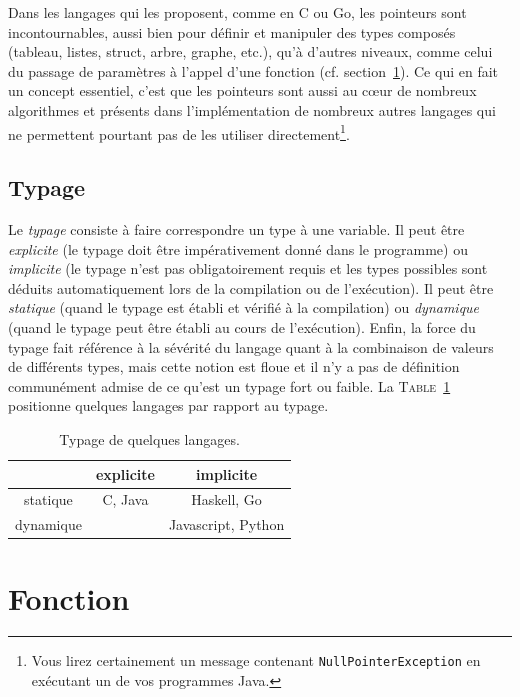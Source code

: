 \documentclass[a4paper,francais]{insalyon}
\begin{document}
Dans les langages qui les proposent, comme en C ou Go, les pointeurs sont incontournables, aussi bien pour définir et manipuler des types composés (tableau, listes, struct, arbre, graphe, etc.), qu'à d'autres niveaux, comme celui du passage de paramètres à l'appel d'une fonction (cf. section~\ref{sec:fonction}). Ce qui en fait un concept essentiel, c'est que les pointeurs sont aussi au c\oe{}ur de nombreux algorithmes et présents dans l'implémentation de nombreux autres langages qui ne permettent pourtant pas de les utiliser directement\footnote{Vous lirez certainement un message contenant \texttt{NullPointerException} en exécutant un de vos programmes Java.}.


\subsection{Typage}

Le \emph{typage} consiste à faire correspondre un type à une variable. Il peut être \emph{explicite} (le typage doit être impérativement donné dans le programme) ou \emph{implicite} (le typage n'est pas obligatoirement requis et les types possibles sont déduits automatiquement lors de la compilation ou de l'exécution). Il peut être \emph{statique} (quand le typage est établi et vérifié à la compilation) ou \emph{dynamique} (quand le typage peut être établi au cours de l'exécution). Enfin, la force du typage fait référence à la sévérité du langage quant à la combinaison de valeurs de différents types, mais cette notion est floue et il n'y a pas de définition communément admise de ce qu'est un typage fort ou faible. La \textsc{Table}~\ref{tab:typage} positionne quelques langages par rapport au typage. 

\begin{table}[htbp]
  \centering
\begin{tabular}{c|c|c}
  ~ & explicite & implicite \\ \hline 
  statique & C, Java & Haskell, Go \\ \hline
  dynamique & ~ & Javascript, Python
\end{tabular}
\caption{Typage de quelques langages.}
\label{tab:typage}
\end{table}


\section{Fonction}
\label{sec:fonction}
\end{document}
